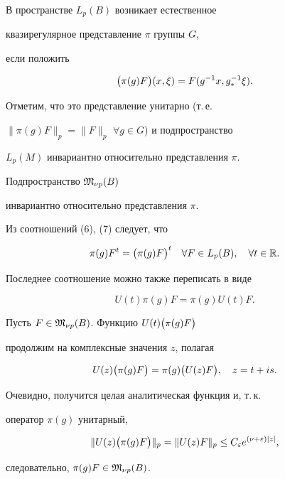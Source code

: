 В пространстве $L_p(B)$ возникает естественное


квазирегулярное представление $\pi$ группы $G$,


если положить


$$


\bl \pi(g)F\br (x,\xi)=F(g^{-1}x,g^{-1}_*\xi).


$$


Отметим, что это представление унитарно (т.\,е.


$\|\pi(g)F\|_p=\|F\|_p$ $\forall g\in G$) и подпространство


$L_p(M)$ инвариантно относительно представления $\pi$.





\begin{lem}


Подпространство $\frak M_{\nu p}(B)$


инвариантно относительно представления $\pi$.


\end{lem}





\begin{pf}


Из соотношений (6), (7) следует, что


$$


\pi(g)F^t=\bl\pi(g)F\br^t\quad \forall F\in L_p(B),


\quad\forall t\in\Ra.


$$


Последнее соотношение можно также переписать в виде


$$


U(t)\pi(g)F=\pi(g)U(t)F.


$$





Пусть $F\in\frak M_{\nu p}(B)$. Функцию $U(t)\bigl(\pi(g)F\bigr)$


продолжим на комплексные значения $z$, полагая


$$


U(z)\bl\pi(g)F\br=\pi(g)\bl U(z)F\br,\quad z=t+is.


$$


Очевидно, получится целая аналитическая функция и, т.\,к.


оператор $\pi(g)$ унитарный,


$$


\|U(z)\bl\pi(g)F\br\|_p=\|U(z)F\|_p\le C_\ep e^{(\nu+\ep)


|z|},


$$


следовательно, $\pi(g)F\in\frak M_{\nu p}(B)$.


\end{pf}





